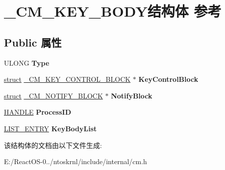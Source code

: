 \hypertarget{struct___c_m___k_e_y___b_o_d_y}{}\section{\+\_\+\+C\+M\+\_\+\+K\+E\+Y\+\_\+\+B\+O\+D\+Y结构体 参考}
\label{struct___c_m___k_e_y___b_o_d_y}
\subsection*{Public 属性}
\begin{DoxyCompactItemize}
\item 
\mbox{\label{struct___c_m___k_e_y___b_o_d_y_a15bea3b3aae6d605ecef6680f90bfcf3}} 
U\+L\+O\+NG {\bfseries Type}
\item 
\mbox{\label{struct___c_m___k_e_y___b_o_d_y_ad4f02b9c2ab3d3df2bba9f295f379a67}} 
\hyperlink{interfacestruct}{struct} \hyperlink{struct___c_m___k_e_y___c_o_n_t_r_o_l___b_l_o_c_k}{\+\_\+\+C\+M\+\_\+\+K\+E\+Y\+\_\+\+C\+O\+N\+T\+R\+O\+L\+\_\+\+B\+L\+O\+CK} $\ast$ {\bfseries Key\+Control\+Block}
\item 
\mbox{\label{struct___c_m___k_e_y___b_o_d_y_aa1bb41d20e3ef3ceb32f4f32b469e747}} 
\hyperlink{interfacestruct}{struct} \hyperlink{struct___c_m___n_o_t_i_f_y___b_l_o_c_k}{\+\_\+\+C\+M\+\_\+\+N\+O\+T\+I\+F\+Y\+\_\+\+B\+L\+O\+CK} $\ast$ {\bfseries Notify\+Block}
\item 
\mbox{\label{struct___c_m___k_e_y___b_o_d_y_a8d3811fcaf0dafb360ad5c6bbd029437}} 
\hyperlink{interfacevoid}{H\+A\+N\+D\+LE} {\bfseries Process\+ID}
\item 
\mbox{\label{struct___c_m___k_e_y___b_o_d_y_af623111874d20505c1f5b4d9328957b0}} 
\hyperlink{struct___l_i_s_t___e_n_t_r_y}{L\+I\+S\+T\+\_\+\+E\+N\+T\+RY} {\bfseries Key\+Body\+List}
\end{DoxyCompactItemize}


该结构体的文档由以下文件生成\+:\begin{DoxyCompactItemize}
\item 
E\+:/\+React\+O\+S-\/0../ntoskrnl/include/internal/cm.\+h\end{DoxyCompactItemize}
